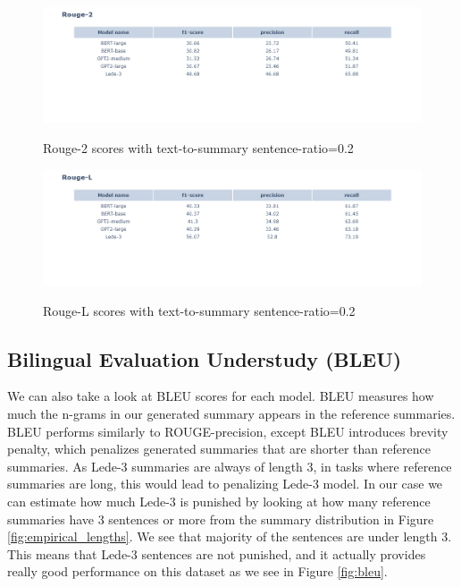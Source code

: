 \documentclass{article}
\begin{document}
\begin{figure}[H]
	\centering
	\hspace*{-3cm}
	\includegraphics[scale=0.55]{rouge2.png}\\
	\caption{Rouge-2 scores with text-to-summary sentence-ratio=0.2}
	\label{fig:rouge2_02}
\end{figure}

\begin{figure}[H]
	\centering
	\hspace*{-3cm}
	\includegraphics[scale=0.55]{rougel.png}\\
	\caption{Rouge-L scores with text-to-summary sentence-ratio=0.2}
	\label{fig:rougel_02}
\end{figure}

\subsection{Bilingual Evaluation Understudy (BLEU)}

\noindent
We can also take a look at BLEU scores for each model. BLEU measures how much the n-grams in our generated summary appears in the reference summaries. BLEU performs similarly to ROUGE-precision, except BLEU introduces brevity penalty, which penalizes generated summaries that are shorter than reference summaries. As Lede-3 summaries are always of length 3, in tasks where reference summaries are long, this would lead to penalizing Lede-3 model. In our case we can estimate how much Lede-3 is punished by looking at how many reference summaries have 3 sentences or more from the summary distribution in Figure \ref{fig:empirical_lengths}. We see that majority of the sentences are under length 3. This means that Lede-3 sentences are not punished, and it actually provides really good performance on this dataset as we see in Figure \ref{fig:bleu}. 
\end{document}

